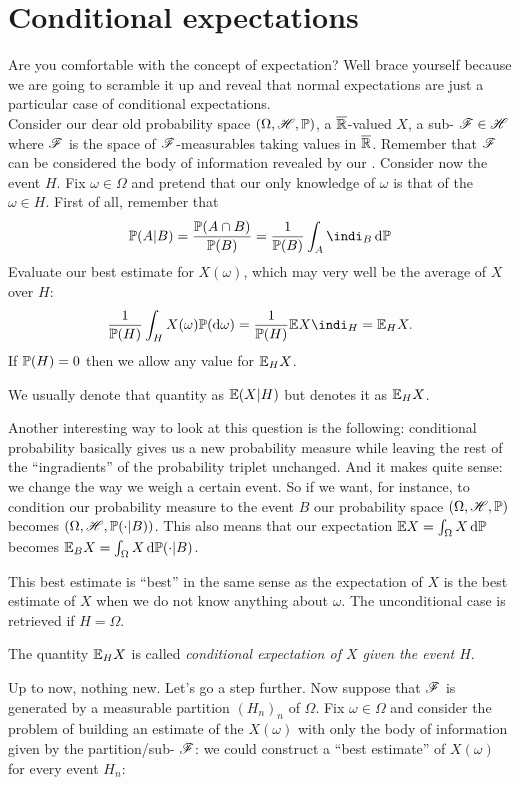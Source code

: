 \documentclass{report}
\begin{document}
\section{Conditional expectations}
Are you comfortable with the concept of expectation? Well brace yourself because we are going to scramble it up and reveal that normal expectations are just a particular case of conditional expectations.\\
Consider our dear old probability space $(\Omega,\mathscr{H},\mathbb{P})$, a $\overline{\mathbb{R}}$-valued \rv{} $X$, a sub-\sa{} $\mathscr{F}\in\mathscr{H}$ where $\mathscr{F}$ is the space of $\mathscr{F}$-measurable\rv s taking values in $\overline{\mathbb{R}}$. Remember that $\mathscr{F}$ can be considered the body of information revealed by our \rv{}. Consider now the event $H$. Fix $\omega\in\Omega$ and pretend that our only knowledge of $\omega$ is that of the $\omega\in H$. First of all, remember that
\[\pr(A|B)=\frac{\pr(A\cap B)}{\pr(B)}=\frac{1}{\pr(B)}\int_A\indi_B\dpr\]
Evaluate our best estimate for $X(\omega)$, which may very well be the average of $X$ over $H$:
\begin{equation*}
	\frac{1}{\pr(H)}\int_H X(\omega)\pr(\dw)=\frac{1}{\pr(H)}\ev X\indi_H=\ev_H X.
\end{equation*}
If $\mathbb{P}(H)=0$ then we allow any value for $\mathbb{E}_H X$.
\begin{notation}
	We usually denote that quantity as $\mathbb{E}(X|H)$ but \cinlar denotes it as $\mathbb{E}_H X$.
\end{notation}
Another interesting way to look at this question is the following: conditional probability basically gives us a new probability measure while leaving the rest of the ``ingradients'' of the probability triplet unchanged. And it makes quite sense: we change the way we weigh a certain event. So if we want, for instance, to condition our probability measure to the event $B$ our probability space $(\Omega,\mathscr{H},\mathbb{P})$ becomes $(\Omega,\mathscr{H},\mathbb{P}(\cdot|B))$. This also means that our expectation $\mathbb{E} X=\int_\Omega X\mathop{}\!\mathrm{d}\mathbb{P}$ becomes $\mathbb{E}_B X=\int_\Omega X\mathop{}\!\mathrm{d}\mathbb{P}(\cdot|B)$.
\begin{remark}
	This best estimate is ``best'' in the same sense as the expectation of $X$ is the best estimate of $X$ when we do not know anything about $\omega$. The unconditional case is retrieved if $H=\Omega$.
\end{remark}
\begin{remark}
	The quantity $\mathbb{E}_H X$ is called \emph{conditional expectation of $X$ given the event $H$}.
\end{remark}
Up to now, nothing new. Let's go a step further. Now suppose that $\mathscr{F}$ is generated by a measurable partition ${(H_n)}_{n}$ of $\Omega$. Fix $\omega\in\Omega$ and consider the problem of building an estimate of the \rv{} $X(\omega)$ with only the body of information given by the partition/sub-\sa{} $\mathscr{F}$: we could construct a ``best estimate'' of $X(\omega)$ for every event $H_n$:
\end{document}
